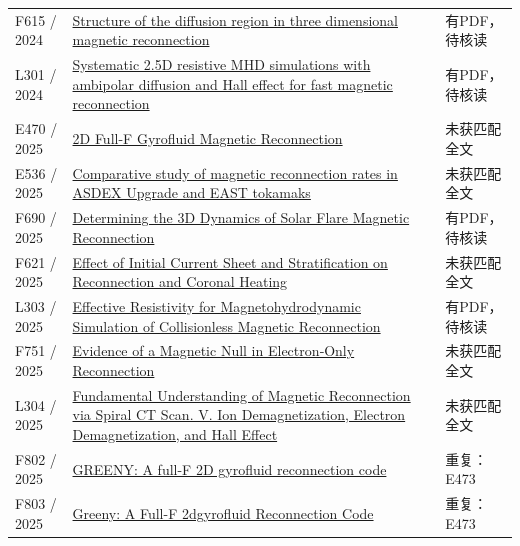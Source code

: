 \begin{longtable}{P{24mm}P{97mm}P{27mm}}
F615 / 2024 & \href{https://doi.org/10.58088/x3fm-h327}{Structure of the diffusion region in three dimensional magnetic reconnection} & 有PDF，待核读\\

L301 / 2024 & \href{https://doi.org/10.1016/j.physleta.2024.129897}{Systematic 2.5D resistive MHD simulations with ambipolar diffusion and Hall effect for fast magnetic reconnection} & 有PDF，待核读\\

E470 / 2025 & \href{https://resolver.obvsg.at/urn:nbn:at:at-ubi:1-175860}{2D Full-F Gyrofluid Magnetic Reconnection} & 未获匹配全文\\

E536 / 2025 & \href{https://doi.org/10.1063/5.0243286}{Comparative study of magnetic reconnection rates in ASDEX Upgrade and EAST tokamaks} & 未获匹配全文\\

F690 / 2025 & \href{https://doi.org/10.3847/1538-4357/ae03c5}{Determining the 3D Dynamics of Solar Flare Magnetic Reconnection} & 有PDF，待核读\\

F621 / 2025 & \href{https://doi.org/10.3847/1538-4357/adfedd}{Effect of Initial Current Sheet and Stratification on Reconnection and Coronal Heating} & 未获匹配全文\\

L303 / 2025 & \href{https://doi.org/10.1029/2025ja034289}{Effective Resistivity for Magnetohydrodynamic Simulation of Collisionless Magnetic Reconnection} & 有PDF，待核读\\

F751 / 2025 & \href{https://doi.org/10.1029/2024gl113104}{Evidence of a Magnetic Null in Electron‐Only Reconnection} & 未获匹配全文\\

L304 / 2025 & \href{https://doi.org/10.3847/1538-4357/ae0ffc}{Fundamental Understanding of Magnetic Reconnection via Spiral CT Scan. V. Ion Demagnetization,  Electron Demagnetization,  and Hall Effect} & 未获匹配全文\\

F802 / 2025 & \href{https://doi.org/10.1016/j.cpc.2025.109807}{GREENY: A full-F 2D gyrofluid reconnection code} & 重复：E473\\

F803 / 2025 & \href{https://doi.org/10.2139/ssrn.5201132}{Greeny: A Full-F 2dgyrofluid Reconnection Code} & 重复：E473\\


\end{longtable}

